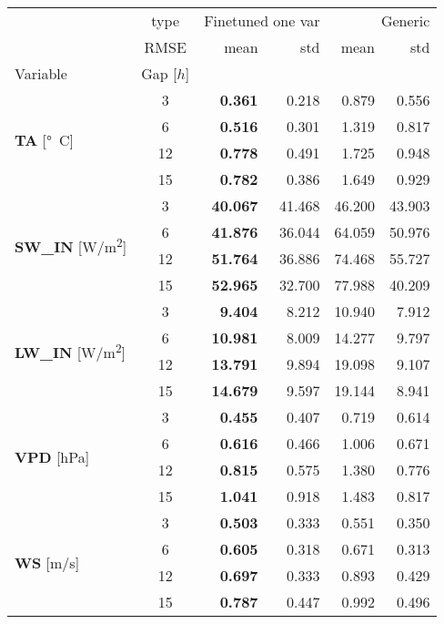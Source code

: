 \begin{table}
\centering
\begin{tabular}{p{2.1cm}c|rr|rr}
\toprule
 & type & \multicolumn{2}{r}{Finetuned one var} & \multicolumn{2}{r}{Generic} \\
 & RMSE & mean & std & mean & std \\
Variable & Gap [$h$] &  &  &  &  \\
\midrule
\multirow[c]{4}{*}{\parbox{2.1cm}{\textbf{TA} [\si{°C}]}} & 3 & \bfseries 0.361 & 0.218 & 0.879 & 0.556 \\
 & 6 & \bfseries 0.516 & 0.301 & 1.319 & 0.817 \\
 & 12 & \bfseries 0.778 & 0.491 & 1.725 & 0.948 \\
 & 15 & \bfseries 0.782 & 0.386 & 1.649 & 0.929 \\
\cline{1-6}
\multirow[c]{4}{*}{\parbox{2.1cm}{\textbf{SW\_IN} [\si{W/m^2}]}} & 3 & \bfseries 40.067 & 41.468 & 46.200 & 43.903 \\
 & 6 & \bfseries 41.876 & 36.044 & 64.059 & 50.976 \\
 & 12 & \bfseries 51.764 & 36.886 & 74.468 & 55.727 \\
 & 15 & \bfseries 52.965 & 32.700 & 77.988 & 40.209 \\
\cline{1-6}
\multirow[c]{4}{*}{\parbox{2.1cm}{\textbf{LW\_IN} [\si{W/m^2}]}} & 3 & \bfseries 9.404 & 8.212 & 10.940 & 7.912 \\
 & 6 & \bfseries 10.981 & 8.009 & 14.277 & 9.797 \\
 & 12 & \bfseries 13.791 & 9.894 & 19.098 & 9.107 \\
 & 15 & \bfseries 14.679 & 9.597 & 19.144 & 8.941 \\
\cline{1-6}
\multirow[c]{4}{*}{\parbox{2.1cm}{\textbf{VPD} [\si{hPa}]}} & 3 & \bfseries 0.455 & 0.407 & 0.719 & 0.614 \\
 & 6 & \bfseries 0.616 & 0.466 & 1.006 & 0.671 \\
 & 12 & \bfseries 0.815 & 0.575 & 1.380 & 0.776 \\
 & 15 & \bfseries 1.041 & 0.918 & 1.483 & 0.817 \\
\cline{1-6}
\multirow[c]{4}{*}{\parbox{2.1cm}{\textbf{WS} [\si{m/s}]}} & 3 & \bfseries 0.503 & 0.333 & 0.551 & 0.350 \\
 & 6 & \bfseries 0.605 & 0.318 & 0.671 & 0.313 \\
 & 12 & \bfseries 0.697 & 0.333 & 0.893 & 0.429 \\
 & 15 & \bfseries 0.787 & 0.447 & 0.992 & 0.496 \\

\end{tabular}
\end{table}
